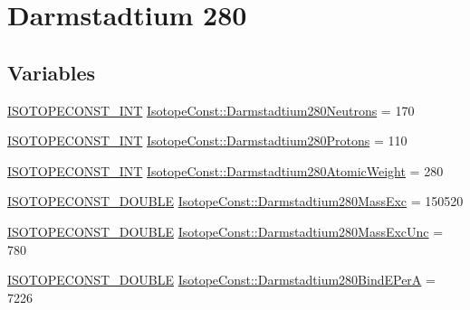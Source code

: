 \hypertarget{group___isotope_const-_darmstadtium-_ds280}{}\section{Darmstadtium 280}
\label{group___isotope_const-_darmstadtium-_ds280}
\subsection*{Variables}
\begin{DoxyCompactItemize}
\item 
\mbox{\hyperlink{group___isotope_const-_macros_ga5f18360b3e99483a35c32d789e62621c}{I\+S\+O\+T\+O\+P\+E\+C\+O\+N\+S\+T\+\_\+\+I\+NT}} \mbox{\hyperlink{group___isotope_const-_darmstadtium-_ds280_gaaaa11ef853f7b1810275203a6be3bceb}{Isotope\+Const\+::\+Darmstadtium280\+Neutrons}} = 170
\item 
\mbox{\hyperlink{group___isotope_const-_macros_ga5f18360b3e99483a35c32d789e62621c}{I\+S\+O\+T\+O\+P\+E\+C\+O\+N\+S\+T\+\_\+\+I\+NT}} \mbox{\hyperlink{group___isotope_const-_darmstadtium-_ds280_gaa4b38753e3c4fd161e6998ae9c9607a4}{Isotope\+Const\+::\+Darmstadtium280\+Protons}} = 110
\item 
\mbox{\hyperlink{group___isotope_const-_macros_ga5f18360b3e99483a35c32d789e62621c}{I\+S\+O\+T\+O\+P\+E\+C\+O\+N\+S\+T\+\_\+\+I\+NT}} \mbox{\hyperlink{group___isotope_const-_darmstadtium-_ds280_ga6f14062b07b43977050a2e5d0925e7a1}{Isotope\+Const\+::\+Darmstadtium280\+Atomic\+Weight}} = 280
\item 
\mbox{\hyperlink{group___isotope_const-_macros_ga8f45a7272ce02c0b4c65c44636ed719a}{I\+S\+O\+T\+O\+P\+E\+C\+O\+N\+S\+T\+\_\+\+D\+O\+U\+B\+LE}} \mbox{\hyperlink{group___isotope_const-_darmstadtium-_ds280_ga9783aafdf6e5da751c5b8e1e0ee74782}{Isotope\+Const\+::\+Darmstadtium280\+Mass\+Exc}} = 150520
\item 
\mbox{\hyperlink{group___isotope_const-_macros_ga8f45a7272ce02c0b4c65c44636ed719a}{I\+S\+O\+T\+O\+P\+E\+C\+O\+N\+S\+T\+\_\+\+D\+O\+U\+B\+LE}} \mbox{\hyperlink{group___isotope_const-_darmstadtium-_ds280_ga00b423a181ef2953e000b408ae34cf21}{Isotope\+Const\+::\+Darmstadtium280\+Mass\+Exc\+Unc}} = 780
\item 
\mbox{\hyperlink{group___isotope_const-_macros_ga8f45a7272ce02c0b4c65c44636ed719a}{I\+S\+O\+T\+O\+P\+E\+C\+O\+N\+S\+T\+\_\+\+D\+O\+U\+B\+LE}} \mbox{\hyperlink{group___isotope_const-_darmstadtium-_ds280_ga363094922e09783d7a60f2b14e49276d}{Isotope\+Const\+::\+Darmstadtium280\+Bind\+E\+PerA}} = 7226

\end{DoxyCompactItemize}
